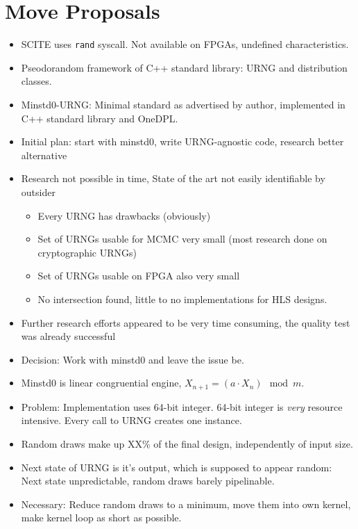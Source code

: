 \section{Move Proposals}
\label{sec:move_proposal}

\begin{itemize}
    \item SCITE uses \texttt{rand} syscall. Not available on FPGAs, undefined characteristics.
    \item Pseodorandom framework of C++ standard library: URNG and distribution classes.
    \item Minstd0-URNG: Minimal standard as advertised by author, implemented in C++ standard library and OneDPL.
    \item Initial plan: start with minstd0, write URNG-agnostic code, research better alternative
    \item Research not possible in time, State of the art not easily identifiable by outsider
    \begin{itemize}
        \item Every URNG has drawbacks (obviously)
        \item Set of URNGs usable for MCMC very small (most research done on cryptographic URNGs)
        \item Set of URNGs usable on FPGA also very small
        \item No intersection found, little to no implementations for HLS designs.
    \end{itemize}
    \item Further research efforts appeared to be very time consuming, the quality test was already successful
    \item Decision: Work with minstd0 and leave the issue be.
    \item Minstd0 is linear congruential engine, $X_{n+1} = (a \cdot X_n) \mod m$.
    \item Problem: Implementation uses 64-bit integer. 64-bit integer is \emph{very} resource intensive. Every call to URNG creates one instance.
    \item Random draws make up XX\% of the final design, independently of input size.
    \item Next state of URNG is it's output, which is supposed to appear random: Next state unpredictable, random draws barely pipelinable.
    \item Necessary: Reduce random draws to a minimum, move them into own kernel, make kernel loop as short as possible.
\end{itemize}